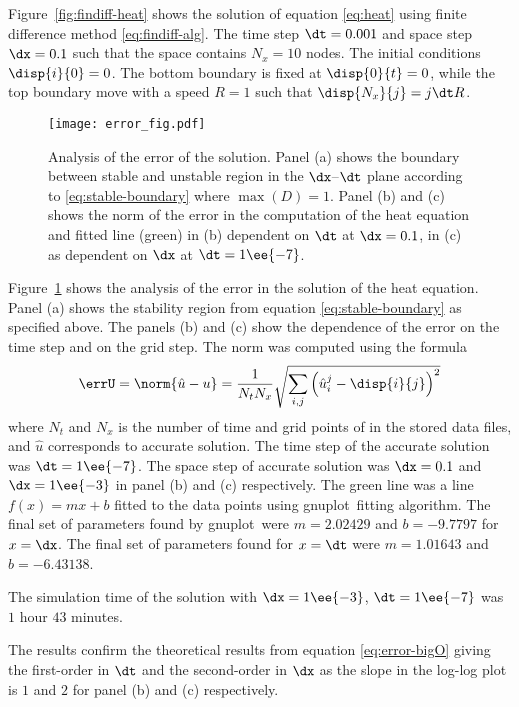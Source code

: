 \documentclass[twoside,a4paper,12pt]{article}
\newcommand{\figref}[1]{Figure~\ref{#1}}
\newcommand{\prog}[1]{\textsf{#1}}
\newcommand{\gnuplot}{\prog{gnuplot}}
\begin{document}
\figref{fig:findiff-heat} shows the solution of equation
\eqref{eq:heat} using finite difference method
\eqref{eq:findiff-alg}. The time step $\dt=0.001$ and space step
$\dx = 0.1$ such that the space contains $N_x=10$ nodes. The initial
conditions $\disp{i}{0} = 0$. The bottom boundary is fixed at
$\disp{0}{t} = 0$, while the top boundary move with a speed $R=1$ such
that $\disp{N_x}{j} = j \dt R$.
\begin{figure}
  \centering
  \texttt{[image: error\_fig.pdf]}
  \caption{Analysis of the error of the solution. Panel (a) shows the
    boundary between stable and unstable region in the $\dx$--$\dt$
    plane according to \eqref{eq:stable-boundary} where $\max(D) =
    1$. Panel (b) and (c) shows the norm of the error in the
    computation of the heat equation and fitted line (green) in (b)
    dependent on $\dt$ at $\dx=0.1$, in (c) as dependent on $\dx$ at
    $\dt=1\ee{-7}$.}
  \label{fig:error-analysis}
\end{figure}

\figref{fig:error-analysis} shows the analysis of the error in the
solution of the heat equation. Panel (a) shows the stability region
from equation \eqref{eq:stable-boundary} as specified above. The
panels (b) and (c) show the dependence of the error on the time step
and on the grid step. The norm was computed using the formula
%
\begin{align}
  \errU = \norm{\hat{u} - u} = \frac{1}{N_t N_x}\sqrt{ \sum_{i,j} \left(\hat{u}_{i}^{j} - \disp{i}{j}\right)^2} \label{eq:norm}
\end{align}
where $N_t$ and $N_x$ is the number of time and grid points of in the
stored data files, and $\hat{u}$ corresponds to accurate solution. The
time step of the accurate solution was $\dt = 1\ee{-7}$. The space
step of accurate solution was $\dx=0.1$ and $\dx=1\ee{-3}$ in panel
(b) and (c) respectively. The green line was a line $f(x) = m x + b$
fitted to the data points using \gnuplot\ fitting algorithm. The final
set of parameters found by \gnuplot\ were $m = 2.02429$ and
$b=-9.7797$ for $x = \dx$. The final set of parameters found for
$x=\dt$ were $m=1.01643$ and $b=-6.43138$.

The simulation time of the solution with $\dx=1\ee{-3}$, $\dt=1\ee{-7}$
was $1$ hour $43$ minutes.

The results confirm the theoretical results from equation
\eqref{eq:error-bigO} giving the first-order in $\dt$ and the
second-order in $\dx$ as the slope in the log-log plot is $1$ and $2$
for panel (b) and (c) respectively.
\end{document}
